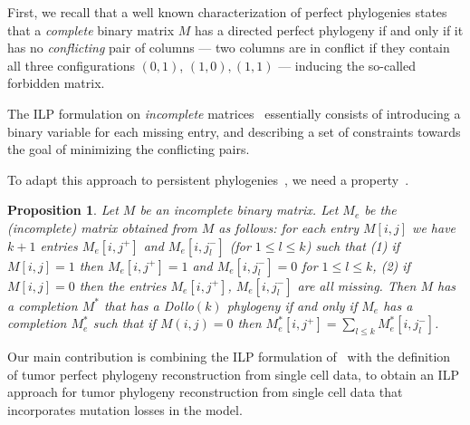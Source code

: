 \documentclass[a4paper,USenglish]{article}
\newtheorem{proposition}[theorem]{Proposition}
\theoremstyle{definition}
\begin{document}

First, we recall that a well known characterization of perfect
phylogenies states that a \emph{complete} binary matrix $M$ has a
directed perfect phylogeny if and only if it has no \emph{conflicting}
pair of columns --- two columns are in conflict if they contain all
three configurations $(0,1)$, $(1,0), (1,1)$ --- inducing the
so-called forbidden matrix.

The ILP formulation on \emph{incomplete} matrices~\cite{Gusfield2007}
essentially consists of introducing a binary variable for each missing
entry, and describing a set of constraints towards the goal of
minimizing the conflicting pairs.

To adapt this approach to persistent
phylogenies~\cite{gusfield_persistent_2015}, we need a
property~\cite{Bonizzoni:2017:BPP:3107411.3107441}.

\begin{proposition}
  \label{proposition:extended matrix}
  Let $M$ be an incomplete binary matrix.  Let $M_{e}$ be the
  (incomplete) matrix obtained from $M$ as follows: for each entry
  $M[i,j]$ we have $k+1$ entries $M_{e}[i,j^{+}]$ and
  $M_{e}[i,j_{l}^{-}]$ (for $1\le l\le k$) such that (1) if
  $M[i,j] = 1$ then $M_{e}[i,j^{+}] = 1$ and $M_{e}[i,j_{l}^{-}] = 0$
  for $1\le l\le k$, (2) if $M[i,j] = 0$ then the entries
  $M_{e}[i,j^{+}]$, $ M_{e}[i,j_{l}^{-}]$ are all missing.  Then $M$
  has a completion $M^{*}$ that has a Dollo$(k)$ phylogeny if and only
  if $M_{e}$ has a completion $M^{*}_{e}$ such that if $M(i,j)= 0$
  then $M^{*}_{e}[i,j^{+}] = \sum_{l\le k} M^{*}_{e}[i,j_{l}^{-}]$.
\end{proposition}

Our main contribution is combining the ILP formulation
of~\cite{Bonizzoni:2017:BPP:3107411.3107441} with the definition of
tumor perfect phylogeny reconstruction from single cell data, to
obtain an ILP approach for tumor phylogeny reconstruction from single
cell data that incorporates mutation losses in the model.
\end{document}
